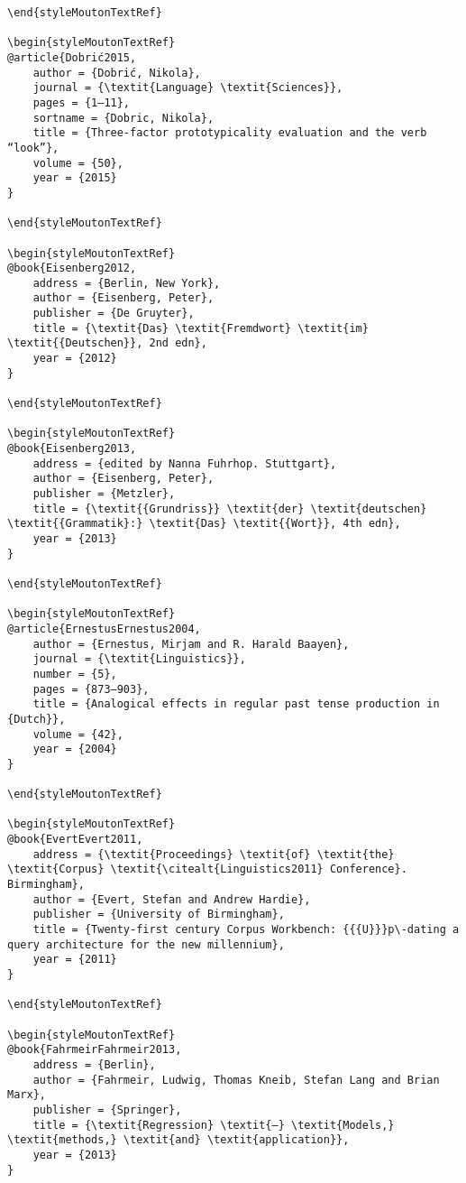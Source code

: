 \begin{styleMoutonHeadingi}
\begin{verbatim}
\end{styleMoutonTextRef}

\begin{styleMoutonTextRef}
@article{Dobrić2015,
	author = {Dobrić, Nikola},
	journal = {\textit{Language} \textit{Sciences}},
	pages = {1–11},
	sortname = {Dobric, Nikola},
	title = {Three-factor prototypicality evaluation and the verb “look”},
	volume = {50},
	year = {2015}
}

\end{styleMoutonTextRef}

\begin{styleMoutonTextRef}
@book{Eisenberg2012,
	address = {Berlin, New York},
	author = {Eisenberg, Peter},
	publisher = {De Gruyter},
	title = {\textit{Das} \textit{Fremdwort} \textit{im} \textit{{Deutschen}}, 2nd edn},
	year = {2012}
}

\end{styleMoutonTextRef}

\begin{styleMoutonTextRef}
@book{Eisenberg2013,
	address = {edited by Nanna Fuhrhop. Stuttgart},
	author = {Eisenberg, Peter},
	publisher = {Metzler},
	title = {\textit{{Grundriss}} \textit{der} \textit{deutschen} \textit{{Grammatik}:} \textit{Das} \textit{{Wort}}, 4th edn},
	year = {2013}
}

\end{styleMoutonTextRef}

\begin{styleMoutonTextRef}
@article{ErnestusErnestus2004,
	author = {Ernestus, Mirjam and R. Harald Baayen},
	journal = {\textit{Linguistics}},
	number = {5},
	pages = {873–903},
	title = {Analogical effects in regular past tense production in {Dutch}},
	volume = {42},
	year = {2004}
}

\end{styleMoutonTextRef}

\begin{styleMoutonTextRef}
@book{EvertEvert2011,
	address = {\textit{Proceedings} \textit{of} \textit{the} \textit{Corpus} \textit{\citealt{Linguistics2011} Conference}. Birmingham},
	author = {Evert, Stefan and Andrew Hardie},
	publisher = {University of Birmingham},
	title = {Twenty-first century Corpus Workbench: {{{U}}}p\-dating a query architecture for the new millennium},
	year = {2011}
}

\end{styleMoutonTextRef}

\begin{styleMoutonTextRef}
@book{FahrmeirFahrmeir2013,
	address = {Berlin},
	author = {Fahrmeir, Ludwig, Thomas Kneib, Stefan Lang and Brian Marx},
	publisher = {Springer},
	title = {\textit{Regression} \textit{–} \textit{Models,} \textit{methods,} \textit{and} \textit{application}},
	year = {2013}
}


\end{verbatim}
\end{styleMoutonHeadingi}
